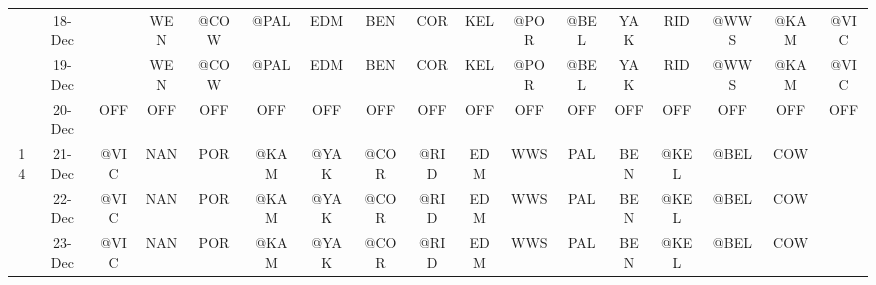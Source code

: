 \begin{table}[htbp]
\begin{tabular}{ccrrrrrrrrrrrrrrr}
          & 18-Dec &       & \multicolumn{1}{c}{WEN} & \multicolumn{1}{c}{@COW} & \multicolumn{1}{c}{@PAL} & \multicolumn{1}{c}{EDM} & \multicolumn{1}{c}{BEN} & \multicolumn{1}{c}{COR} & \multicolumn{1}{c}{KEL} & \multicolumn{1}{c}{@POR} & \multicolumn{1}{c}{@BEL} & \multicolumn{1}{c}{YAK} & \multicolumn{1}{c}{RID} & \multicolumn{1}{c}{@WWS} & \multicolumn{1}{c}{@KAM} & \multicolumn{1}{c}{@VIC} \\
          & 19-Dec &       & \multicolumn{1}{c}{WEN} & \multicolumn{1}{c}{@COW} & \multicolumn{1}{c}{@PAL} & \multicolumn{1}{c}{EDM} & \multicolumn{1}{c}{BEN} & \multicolumn{1}{c}{COR} & \multicolumn{1}{c}{KEL} & \multicolumn{1}{c}{@POR} & \multicolumn{1}{c}{@BEL} & \multicolumn{1}{c}{YAK} & \multicolumn{1}{c}{RID} & \multicolumn{1}{c}{@WWS} & \multicolumn{1}{c}{@KAM} & \multicolumn{1}{c}{@VIC} \\
          & 20-Dec & \multicolumn{1}{c}{OFF} & \multicolumn{1}{c}{OFF} & \multicolumn{1}{c}{OFF} & \multicolumn{1}{c}{OFF} & \multicolumn{1}{c}{OFF} & \multicolumn{1}{c}{OFF} & \multicolumn{1}{c}{OFF} & \multicolumn{1}{c}{OFF} & \multicolumn{1}{c}{OFF} & \multicolumn{1}{c}{OFF} & \multicolumn{1}{c}{OFF} & \multicolumn{1}{c}{OFF} & \multicolumn{1}{c}{OFF} & \multicolumn{1}{c}{OFF} & \multicolumn{1}{c}{OFF} \\
    14    & 21-Dec & \multicolumn{1}{c}{@VIC} & \multicolumn{1}{c}{NAN} & \multicolumn{1}{c}{POR} & \multicolumn{1}{c}{@KAM} & \multicolumn{1}{c}{@YAK} & \multicolumn{1}{c}{@COR} & \multicolumn{1}{c}{@RID} & \multicolumn{1}{c}{EDM} & \multicolumn{1}{c}{WWS} & \multicolumn{1}{c}{PAL} & \multicolumn{1}{c}{BEN} & \multicolumn{1}{c}{@KEL} & \multicolumn{1}{c}{@BEL} & \multicolumn{1}{c}{COW} &  \\
          & 22-Dec & \multicolumn{1}{c}{@VIC} & \multicolumn{1}{c}{NAN} & \multicolumn{1}{c}{POR} & \multicolumn{1}{c}{@KAM} & \multicolumn{1}{c}{@YAK} & \multicolumn{1}{c}{@COR} & \multicolumn{1}{c}{@RID} & \multicolumn{1}{c}{EDM} & \multicolumn{1}{c}{WWS} & \multicolumn{1}{c}{PAL} & \multicolumn{1}{c}{BEN} & \multicolumn{1}{c}{@KEL} & \multicolumn{1}{c}{@BEL} & \multicolumn{1}{c}{COW} &  \\
          & 23-Dec & \multicolumn{1}{c}{@VIC} & \multicolumn{1}{c}{NAN} & \multicolumn{1}{c}{POR} & \multicolumn{1}{c}{@KAM} & \multicolumn{1}{c}{@YAK} & \multicolumn{1}{c}{@COR} & \multicolumn{1}{c}{@RID} & \multicolumn{1}{c}{EDM} & \multicolumn{1}{c}{WWS} & \multicolumn{1}{c}{PAL} & \multicolumn{1}{c}{BEN} & \multicolumn{1}{c}{@KEL} & \multicolumn{1}{c}{@BEL} & \multicolumn{1}{c}{COW} &  \\

\end{tabular}
\end{table}
